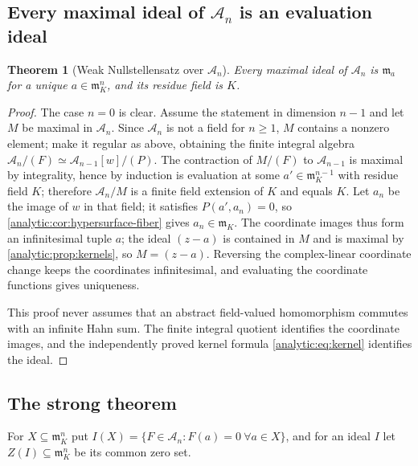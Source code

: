 \documentclass[11pt,letterpaper]{article}
\newtheorem{theorem}{Theorem}[section]
\theoremstyle{definition}
\theoremstyle{remark}
\newcommand{\A}{\mathscr A}
\newcommand{\m}{\mathfrak m}
\numberwithin{equation}{section}
\begin{document}
\subsection{Every maximal ideal of $\A_n$ is an evaluation ideal}
\begin{theorem}[Weak Nullstellensatz over $\A_n$]
\label{analytic:thm:weak-nullA}
Every maximal ideal of $\A_n$ is $\m_a$ for a unique $a\in\m_K^n$, and its
residue field is $K$.
\end{theorem}
\begin{proof}
The case $n=0$ is clear. Assume the statement in dimension $n-1$ and let $M$
be maximal in $\A_n$. Since $\A_n$ is not a field for $n\ge1$, $M$ contains
a nonzero element; make it regular as above, obtaining the finite integral
algebra $\A_n/(F)\simeq\A_{n-1}[w]/(P)$. The contraction of $M/(F)$ to
$\A_{n-1}$ is maximal by integrality, hence by induction is evaluation at
some $a'\in\m_K^{n-1}$ with residue field $K$; therefore $\A_n/M$ is a
finite field extension of $K$ and equals $K$. Let $a_n$ be the image of $w$
in that field; it satisfies $P(a',a_n)=0$, so
\cref{analytic:cor:hypersurface-fiber} gives $a_n\in\m_K$. The coordinate
images thus form an infinitesimal tuple $a$; the ideal $(z-a)$ is contained
in $M$ and is maximal by \cref{analytic:prop:kernels}, so $M=(z-a)$.
Reversing the complex-linear coordinate change keeps the coordinates
infinitesimal, and evaluating the coordinate functions gives uniqueness.

This proof never assumes that an abstract field-valued homomorphism
commutes with an infinite Hahn sum. The finite integral quotient identifies
the coordinate images, and the independently proved kernel formula
\eqref{analytic:eq:kernel} identifies the ideal.
\end{proof}

\subsection{The strong theorem}
For $X\subseteq\m_K^n$ put $I(X)=\{F\in\A_n:F(a)=0\ \forall a\in X\}$, and
for an ideal $I$ let $Z(I)\subseteq\m_K^n$ be its common zero set.
\end{document}
